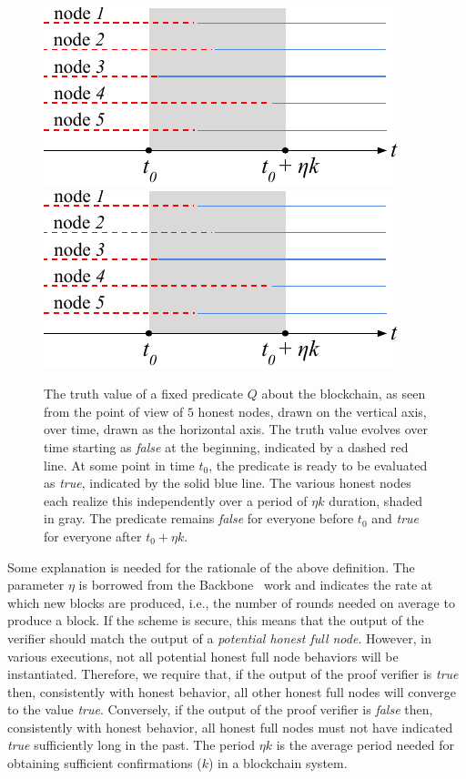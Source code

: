 \begin{figure}
    \caption{The truth value of a fixed predicate $Q$ about the blockchain, as
             seen from the point of view of $5$ honest nodes, drawn on the
             vertical axis, over time, drawn as the horizontal axis. The truth
             value evolves over time starting as \emph{false} at the beginning,
             indicated by a dashed red line. At some point in time $t_0$, the
             predicate is ready to be evaluated as \emph{true}, indicated by the
             solid blue line. The various honest nodes each realize this
             independently over a period of $\eta k$ duration, shaded in gray.
             The predicate remains \emph{false} for everyone before $t_0$ and
             \emph{true} for everyone after $t_0 + \eta k$.}
    \centering
    \iftwocolumn
        \includegraphics[width=\columnwidth,keepaspectratio]{figures/predicate-evolution.pdf}
    \else
        \includegraphics[width=0.4\columnwidth,keepaspectratio]{figures/predicate-evolution.pdf}
    \fi
    \label{fig.hierarchy}
\end{figure}

Some explanation is needed for the rationale of the above definition. The
parameter $\eta$ is borrowed from the Backbone~\cite{backbone} work and
indicates the rate at which new blocks are produced, i.e., the number of rounds
needed on average to produce a block. If the scheme is secure, this means that
the output of the verifier should match the output of a \emph{potential honest
full node}. However, in various executions, not all potential honest full node
behaviors will be instantiated. Therefore, we require that, if the output of the
proof verifier is \emph{true} then, consistently with honest behavior, all other
honest full nodes will converge to the value \emph{true}. Conversely, if the
output of the proof verifier is \emph{false} then, consistently with honest
behavior, all honest full nodes must not have indicated \emph{true} sufficiently
long in the past. The period $\eta k$ is the average period needed for obtaining
sufficient confirmations ($k$) in a blockchain system.

